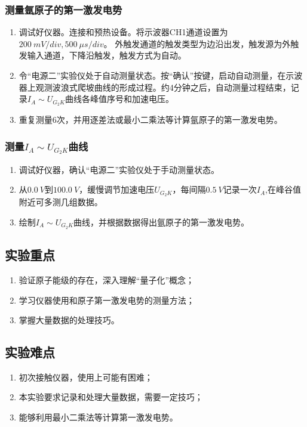 \documentclass[]{../../templates/Report}%
\begin{document}
\subsubsection{测量氩原子的第一激发电势}
\begin{enumerate}
    \item 调试好仪器。连接和预热设备。将示波器CH1通道设置为$\SI{200}{mV/div}, \SI{500}{\mu s/div}$。
    外触发通道的触发类型为边沿出发，触发源为外触发输入通道，下降沿触发，触发方式为自动。
    \item 令“电源二”实验仪处于自动测量状态。按“确认”按键，启动自动测量，在示波器上观测波浪式爬坡曲线的形成过程。约4分钟之后，自动测量过程结束，记录$I_A \sim U_{G_2K}$曲线各峰值序号和加速电压。
    \item 重复测量6次，并用逐差法或最小二乘法等计算氩原子的第一激发电势。
\end{enumerate}

\subsubsection{测量$I_A \sim U_{G_2K}$曲线}
\begin{enumerate}
    \item 调试好仪器，确认“电源二”实验仪处于手动测量状态。
    \item 从$\SI{0.0}{V}$到$\SI{100.0}{V}$，缓慢调节加速电压$U_{G_2K}$，每间隔$\SI{0.5}{V}$记录一次$I_A$,在峰谷值附近可多测几组数据。
    \item 绘制$I_A \sim U_{G_2K}$曲线，并根据数据得出氩原子的第一激发电势。
\end{enumerate}


\subsection{实验重点}
\begin{enumerate}
    \item 验证原子能级的存在，深入理解“量子化”概念；
    \item 学习仪器使用和原子第一激发电势的测量方法；
    \item 掌握大量数据的处理技巧。
\end{enumerate}

\subsection{实验难点}
\begin{enumerate}
    \item 初次接触仪器，使用上可能有困难；
    \item 本实验要求记录和处理大量数据，需要一定技巧；
    \item 能够利用最小二乘法等计算第一激发电势。
\end{enumerate}
\end{document}
